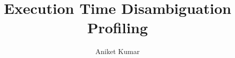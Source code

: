 \documentclass[defaultstyle,11pt]{thesis}
\title{Execution Time Disambiguation Profiling}
\author{Aniket Kumar}{Lata}
\begin{document}
\begin{flushleft}










%
%

\end{flushleft}
\end{document}
